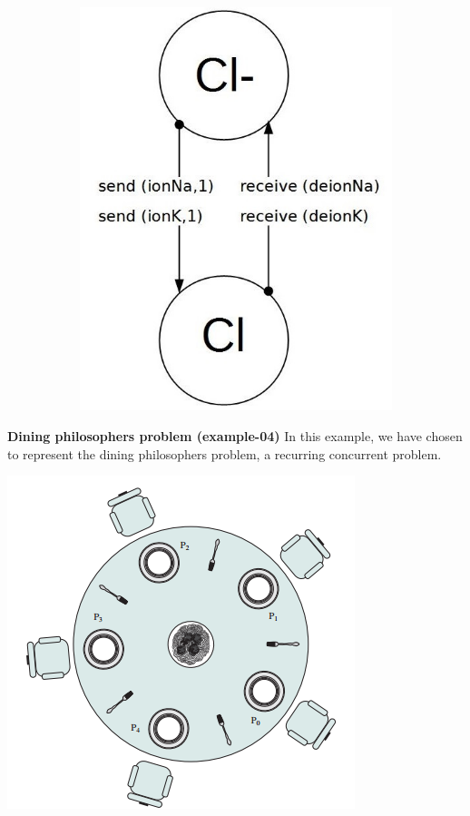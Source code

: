 \documentclass[11pt]{report}
\begin{document}
\begin{figure}[!h]
\begin{subfigure}[b]{0.3\textwidth}
        \includegraphics[width=\textwidth]{Cl.jpg}
    \end{subfigure}
\end{figure}

{}
\tabto{0cm} {\LARGE \textbf{Dining philosophers problem (example-04)}}
\vspace*{3pt}
\vspace*{10pt}
\tabto{1cm}In this example, we have chosen to represent the dining philosophers problem, a recurring concurrent problem.
\begin{center}
\includegraphics[scale = 0.55]{Dining.png}
\end{center}
\end{document}
